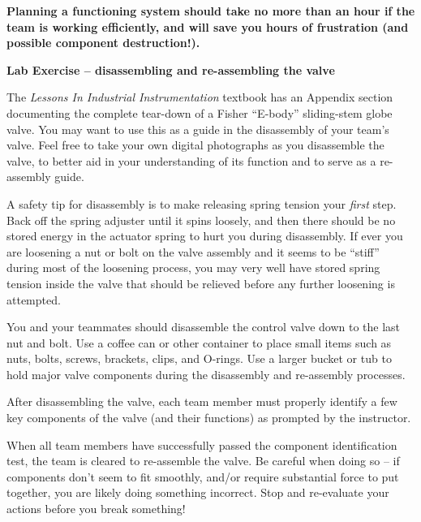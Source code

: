 \documentclass[12pt,a4paper]{article}
\begin{document}
\begin{itemize}
\vskip 10pt

{\bf Planning a functioning system should take no more than an hour if the team is working efficiently, and will save you hours of frustration (and possible component destruction!).}





\vfil \eject

\noindent
{\bf Lab Exercise -- disassembling and re-assembling the valve}

\vskip 5pt

The {\it Lessons In Industrial Instrumentation} textbook has an Appendix section documenting the complete tear-down of a Fisher ``E-body'' sliding-stem globe valve.  You may want to use this as a guide in the disassembly of your team's valve.  Feel free to take your own digital photographs as you disassemble the valve, to better aid in your understanding of its function and to serve as a re-assembly guide.

A safety tip for disassembly is to make releasing spring tension your {\it first} step.  Back off the spring adjuster until it spins loosely, and then there should be no stored energy in the actuator spring to hurt you during disassembly.  If ever you are loosening a nut or bolt on the valve assembly and it seems to be ``stiff'' during most of the loosening process, you may very well have stored spring tension inside the valve that should be relieved before any further loosening is attempted.

You and your teammates should disassemble the control valve down to the last nut and bolt.  Use a coffee can or other container to place small items such as nuts, bolts, screws, brackets, clips, and O-rings.  Use a larger bucket or tub to hold major valve components during the disassembly and re-assembly processes.

\vskip 10pt

After disassembling the valve, each team member must properly identify a few key components of the valve (and their functions) as prompted by the instructor.

\vskip 10pt

When all team members have successfully passed the component identification test, the team is cleared to re-assemble the valve.  Be careful when doing so -- if components don't seem to fit smoothly, and/or require substantial force to put together, you are likely doing something incorrect.  Stop and re-evaluate your actions before you break something!


\end{itemize}
\end{document}
